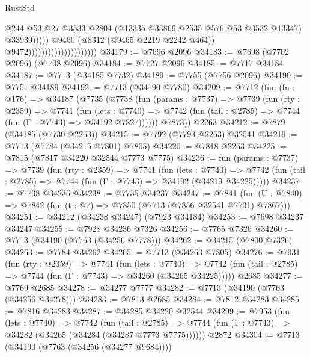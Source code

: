 \begin{lexlean}{RustStd}
\begin{coremodule}
                                                        @244
                                                        @53
                                                        @27
                                                        @3533
                                                        @2804
                                                        (@13335 @33869 @2535 @576 @53 @3532 @13347)
                                                        @33939)))))
                                              @9460
                                              (@8312 (@9465 @2219 @2242 @464))
                                              @9472)))))))))))))))))))))
@34179 := @7696 @2096
@34183 := @7698 (@7702 @2096) (@7708 @2096)
@34184 := @7727 @2096
@34185 := @7717 @34184
@34187 := @7713 (@34185 @7732)
@34189 := @7755 (@7756 @2096)
@34190 := @7751 @34189
@34192 := @7713 (@34190 @7780)
@34209 := @7712
    (fun (fn : @176) =>
    @34187
      (@7735
        (@7738
          (fun (params : @7737) =>
          @7739
            (fun (rty : @2359) =>
            @7741
              (fun (lets : @7740) =>
              @7742 (fun (tail : @2785) => @7744 (fun (Γ : @7743) => @34192 @7827))))))
        @7873))
    @2263
@34212 := @7879 (@34185 (@7730 @2263))
@34215 := @7792 (@7793 @2263) @32541
@34219 := @7713 (@7784 (@34215 @7801) @7805)
@34220 := @7818 @2263
@34225 := @7815 (@7817 @34220 @32544 @7773 @7775)
@34236 := fun (params : @7737) =>
  @7739
    (fun (rty : @2359) =>
    @7741
      (fun (lets : @7740) =>
      @7742 (fun (tail : @2785) => @7744 (fun (Γ : @7743) => @34192 (@34219 @34225)))))
@34237 := @7738 @34236
@34238 := @7735 @34237
@34247 := @7841
    (fun (U : @7840) => @7842 (fun (t : @7) => @7850 (@7713 (@7856 @32541 @7731) @7867)))
@34251 := @34212 (@34238 @34247) (@7923 @34184)
@34253 := @7698 @34237 @34247
@34255 := @7928 @34236 @7326
@34256 := @7765 @7326
@34260 := @7713 (@34190 (@7763 (@34256 @7778)))
@34262 := @34215 (@7800 @7326)
@34263 := @7784 @34262
@34265 := @7713 (@34263 @7805)
@34276 := @7931
    (fun (rty : @2359) =>
    @7741
      (fun (lets : @7740) =>
      @7742 (fun (tail : @2785) => @7744 (fun (Γ : @7743) => @34260 (@34265 @34225)))))
    @2685
@34277 := @7769 @2685
@34278 := @34277 @7777
@34282 := @7713 (@34190 (@7763 (@34256 @34278)))
@34283 := @7813 @2685
@34284 := @7812 @34283
@34285 := @7816 @34283
@34287 := @34285 @34220 @32544
@34299 := @7953
    (fun (lets : @7740) =>
    @7742
      (fun (tail : @2785) =>
      @7744 (fun (Γ : @7743) => @34282 (@34265 (@34284 (@34287 @7773 @7775))))))
    @2872
@34304 := @7713 (@34190 (@7763 (@34256 (@34277 @9684))))

\end{coremodule}
\end{lexlean}
